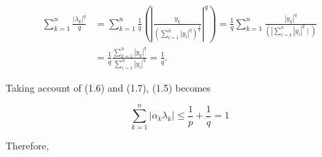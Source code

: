 \documentclass{article}
\begin{document}
\begin{equation}\tag{1.7}
\begin{aligned}
\sum_{k=1}^{n} \frac{\left|\lambda_{k}\right|^{q}}{q} & =\sum_{k=1}^{n} \frac{1}{q}\left(\left|\frac{y_{k}}{\left(\sum_{i=1}^{n}\left|y_{i}\right|^{q}\right)^{\frac{1}{q}}}\right|^{q}\right)=\frac{1}{q} \sum_{k=1}^{n} \frac{\left|y_{k}\right|^{q}}{\left(\left.\left|\sum_{i=1}^{n}\right| y_{i}\right|^{q} \mid\right)} \\
& =\frac{1}{q} \frac{\sum_{k=1}^{n}\left|y_{k}\right|^{q}}{\sum_{i=1}^{n}\left|y_{i}\right|^{q}}=\frac{1}{q} .
\end{aligned}
\end{equation}

Taking account of (1.6) and (1.7), (1.5) becomes

$$
\sum_{k=1}^{n}\left|\alpha_{k} \lambda_{k}\right| \leq \frac{1}{p}+\frac{1}{q}=1
$$

Therefore,
\end{document}
